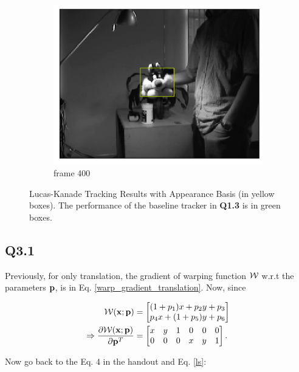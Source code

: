 \documentclass[11pt]{article}
\begin{document}
\begin{figure}[h!]
\begin{subfigure}{.195\textwidth}
      \includegraphics[width=.95\linewidth]{../results/sylvseqrects_399.png}
      \caption{frame 400}
    \end{subfigure}\hfill
    \caption{Lucas-Kanade Tracking Results with Appearance Basis (in yellow boxes). The performance of the baseline tracker in \textbf{Q1.3} is in green boxes. }
    \label{fig:q2.3}
\end{figure}

\newpage
\subsection*{Q3.1}

Previously, for only translation, the gradient of warping function $\mathcal{W}$ w.r.t the parameters $\mathbf{p}$, is in Eq. \ref{warp_gradient_translation}. Now, since

\begin{align}
    \mathcal{W}(\mathbf{x}; \mathbf{p}) &=
    \begin{bmatrix}
        (1+p_1)x+p_2 y+p_3 \\
        p_4 x+(1+p_5) y +p_6
    \end{bmatrix}
    \\ \Rightarrow
    \frac{\partial \mathcal{W}(\mathbf{x}; \mathbf{p})} {\partial \mathbf{p}^T} &=
    \begin{bmatrix}
        x&y&1&0&0&0 \\
        0&0&0&x&y&1
    \end{bmatrix}.
\end{align}

Now go back to the Eq. 4 in the handout and Eq. \ref{ls}:
\newcommand {\Wxdp} {\W(\x;\p+\Delta \p)}
\newcommand {\Wxp} {\W(\x;\p)}
\end{document}
